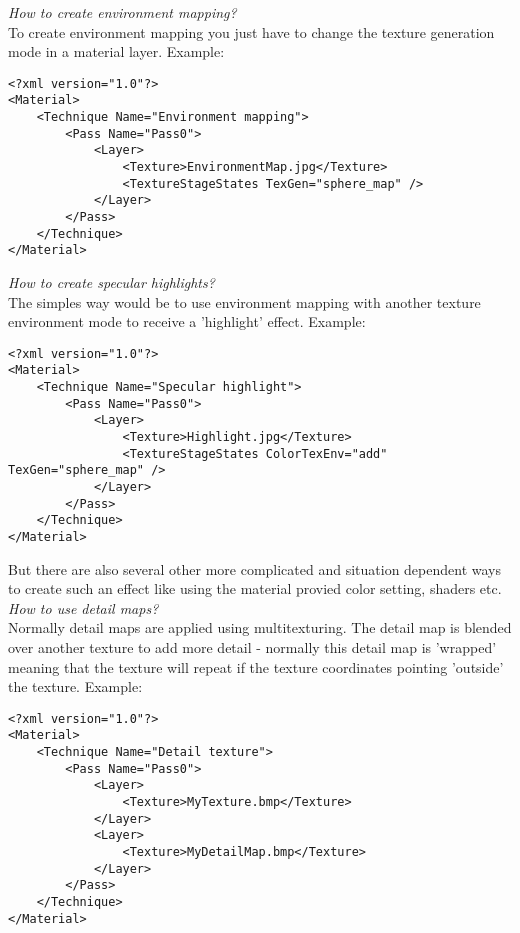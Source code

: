 \emph{How to create environment mapping?}\\
To create environment mapping you just have to change the texture generation mode in a material 
layer. Example:\\

\begin{lstlisting}[caption=Environment mapping]
<?xml version="1.0"?>
<Material>
    <Technique Name="Environment mapping">
        <Pass Name="Pass0">
            <Layer>
                <Texture>EnvironmentMap.jpg</Texture>
                <TextureStageStates TexGen="sphere_map" />
            </Layer>
        </Pass>
    </Technique>
</Material>
\end{lstlisting}


\emph{How to create specular highlights?}\\
The simples way would be to use environment mapping with another texture environment mode to
receive a 'highlight' effect. Example:\\

\begin{lstlisting}[caption=Specular highlights]
<?xml version="1.0"?>
<Material>
    <Technique Name="Specular highlight">
        <Pass Name="Pass0">
            <Layer>
                <Texture>Highlight.jpg</Texture>
                <TextureStageStates ColorTexEnv="add" TexGen="sphere_map" />
            </Layer>
        </Pass>
    </Technique>
</Material>
\end{lstlisting}

But there are also several other more complicated and situation dependent ways to create such
an effect like using the material provied color setting, shaders etc.\\


\emph{How to use detail maps?}\\
Normally detail maps are applied using multitexturing. The detail map is blended over another
texture to add more detail - normally this detail map is 'wrapped' meaning that the texture will
repeat if the texture coordinates pointing 'outside' the texture. Example:\\

\begin{lstlisting}[caption=Detail texture]
<?xml version="1.0"?>
<Material>
    <Technique Name="Detail texture">
        <Pass Name="Pass0">
            <Layer>
                <Texture>MyTexture.bmp</Texture>
            </Layer>
            <Layer>
                <Texture>MyDetailMap.bmp</Texture>
            </Layer>
        </Pass>
    </Technique>
</Material>
\end{lstlisting}

